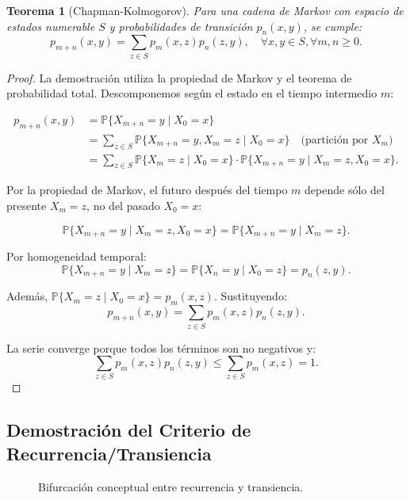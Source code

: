 \documentclass[11pt,a4paper]{article}
\theoremstyle{plain}
\newtheorem{teorema}{Teorema}[section]
\theoremstyle{definition}
\theoremstyle{remark}
\newcommand{\1}{\mathds{1}}
\begin{document}
\begin{teorema}[Chapman-Kolmogorov]
Para una cadena de Markov con espacio de estados numerable \(S\) y probabilidades de transición \(p_n(x,y)\), se cumple:
\[
p_{m+n}(x,y) = \sum_{z\in S} p_m(x,z) p_n(z,y), \quad \forall x,y\in S, \forall m,n\geq 0.
\]
\end{teorema}

\begin{proof}
La demostración utiliza la propiedad de Markov y el teorema de probabilidad total. Descomponemos según el estado en el tiempo intermedio \(m\):

\[
\begin{aligned}
p_{m+n}(x,y) &= \mathbb{P}\{X_{m+n}=y \mid X_0=x\} \\
&= \sum_{z\in S} \mathbb{P}\{X_{m+n}=y, X_m=z \mid X_0=x\} \quad \text{(partición por }X_m\text{)} \\
&= \sum_{z\in S} \mathbb{P}\{X_m=z \mid X_0=x\} \cdot \mathbb{P}\{X_{m+n}=y \mid X_m=z, X_0=x\}.
\end{aligned}
\]

Por la propiedad de Markov, el futuro después del tiempo \(m\) depende sólo del presente \(X_m=z\), no del pasado \(X_0=x\):

\[
\mathbb{P}\{X_{m+n}=y \mid X_m=z, X_0=x\} = \mathbb{P}\{X_{m+n}=y \mid X_m=z\}.
\]

Por homogeneidad temporal:
\[
\mathbb{P}\{X_{m+n}=y \mid X_m=z\} = \mathbb{P}\{X_n=y \mid X_0=z\} = p_n(z,y).
\]

Además, \(\mathbb{P}\{X_m=z \mid X_0=x\} = p_m(x,z)\). Sustituyendo:
\[
p_{m+n}(x,y) = \sum_{z\in S} p_m(x,z) p_n(z,y).
\]

La serie converge porque todos los términos son no negativos y:
\[
\sum_{z\in S} p_m(x,z) p_n(z,y) \leq \sum_{z\in S} p_m(x,z) = 1.
\]
\end{proof}

\subsection{Demostración del Criterio de Recurrencia/Transiencia}


\begin{figure}[h!]
\centering
{}
\caption{Bifurcación conceptual entre recurrencia y transiencia.}
\end{figure}
\end{document}
